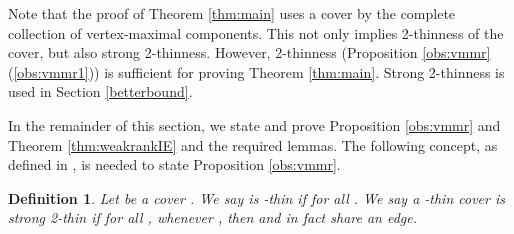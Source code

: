\documentclass[10pt]{article}
\newtheorem{dfn}{Definition}
\begin{document}
\medskip\noindent
Note that the proof of Theorem \ref{thm:main} uses a cover by the complete collection of vertex-maximal components. This not only implies 2-thinness of the cover, but also strong 2-thinness. However, 2-thinness (Proposition \ref{obs:vmmr}(\ref{obs:vmmr1})) is sufficient for proving Theorem \ref{thm:main}. Strong 2-thinness is used in Section \ref{betterbound}.




In the remainder of this section, we state and prove Proposition \ref{obs:vmmr} and Theorem \ref{thm:weakrankIE} and the required lemmas. The following concept, as defined in \cite{JacksonJordanrank:2006}, is needed to state Proposition \ref{obs:vmmr}.

\begin{dfn}\label{dfn:2thin}
Let  be a cover . We say  is {\em -thin} if  for all .  We say a -thin cover  is {\em strong 2-thin} if for all , whenever , then  and  in fact share an edge.
\end{dfn}
\end{document}
